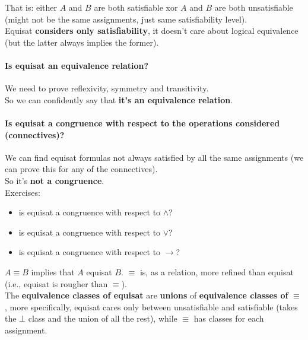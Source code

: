 	That is: either $A$ and $B$ are both satisfiable xor $A$ and $B$ are both unsatisfiable (might not be the same assignments, just same satisfiability level).\\




	Equisat \textbf{considers only satisfiability}, it doesn't care about logical equivalence (but the latter always implies the former).\\

	\paragraph{Is equisat an equivalence relation?} We need to prove reflexivity, symmetry and transitivity.\\
	So we can confidently say that \textbf{it's an equivalence relation}.\\

	\paragraph{Is equisat a congruence with respect to the operations considered (connectives)?} We can find equisat formulas not always satisfied by all the same assignments (we can prove this for any of the connectives).\\
	So it's \textbf{not a congruence}.\\

	Exercises:
	\begin{itemize}
		\item is equisat a congruence with respect to $\wedge$?
		\item is equisat a congruence with respect to $\vee$?
		\item is equisat a congruence with respect to $\rightarrow$?
	\end{itemize}

	$A \equiv B$ implies that $A$ equisat $B$. $\equiv$ is, as a relation, more refined than equisat (i.e., equisat is rougher than $\equiv$).\\

	The \textbf{equivalence classes of equisat} are \textbf{unions} of \textbf{equivalence classes of} $\equiv$, more specifically, equisat cares only between unsatisfiable and satisfiable (takes the $\bot$ class and the union of all the rest), while $\equiv$ has classes for each assignment.\\

